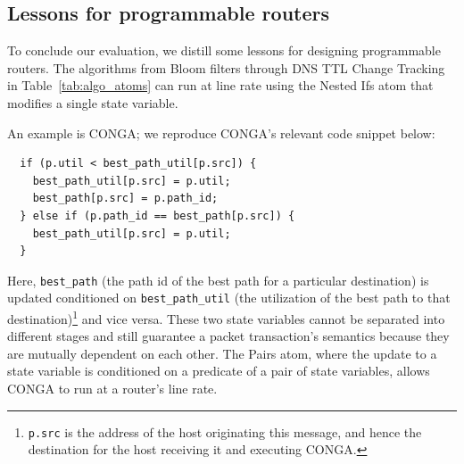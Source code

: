 \subsection{Lessons for programmable routers}
\label{ss:lessons}

To conclude our evaluation, we distill some lessons for designing programmable
routers.
 The algorithms from Bloom filters through DNS TTL Change Tracking
in Table~\ref{tab:algo_atoms} can run at line rate using the Nested Ifs atom
that modifies a single state variable.

An example is CONGA; we reproduce CONGA's relevant code snippet below:
\begin{verbatim}
  if (p.util < best_path_util[p.src]) {
    best_path_util[p.src] = p.util;
    best_path[p.src] = p.path_id;
  } else if (p.path_id == best_path[p.src]) {
    best_path_util[p.src] = p.util;
  }
\end{verbatim}
Here, \texttt{best\_path} (the path id of the best path for a particular
destination) is updated conditioned on \texttt{best\_path\_util} (the
utilization of the best path to that destination)\footnote{{\tt p.src} is the
address of the host originating this message, and hence the destination for the
host receiving it and executing CONGA.} and vice versa. These two state
variables cannot be separated into different stages and still guarantee a
packet transaction's semantics because they are mutually dependent on each
other.  The Pairs atom, where the update to a state variable is conditioned on
a predicate of a pair of state variables, allows CONGA to run at a router's line rate.

